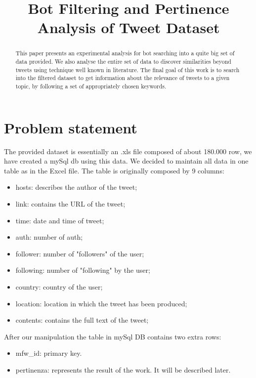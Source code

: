 \documentclass[conference, onecolumn]{IEEEtran}
\begin{document}
\title{{Bot Filtering and Pertinence Analysis of Tweet Dataset}}

\author{
}

\maketitle

\begin{abstract}
	This paper presents an experimental analysis for bot searching into a quite big set of data provided. We also analyse the entire set of data to discover similarities beyond tweets using technique well known in literature. The final goal of this work is to search into the filtered dataset to get information about the relevance of tweets to a given topic, by following a set of appropriately chosen keywords.
\end{abstract}

\section{Problem statement}\label{sec:intro}
\medskip
The provided dataset is essentially an .xls file composed of about 180.000 row, we have created a mySql db using this data. We decided to maintain all data in one table as in the Excel file. The table is originally composed by 9 columns:
\begin{itemize}
	\item hosts: describes the author of the tweet;
	\item link: contains the URL of the tweet;
	\item time: date and time of tweet;
	\item auth: number of auth;
	\item follower: number of "followers" of the user; 
	\item following: number of "following" by the user;
	\item country: country of the user;
	\item location: location in which the tweet has been produced;
	\item contents: contains the full text of the tweet;
\end{itemize}
After our manipulation the table in mySql DB contains two extra rows:
\begin{itemize}
	\item mfw\_id: primary key.
	\item pertinenza: represents the result of the work. It will be described later.
\end{itemize}
\end{document}
